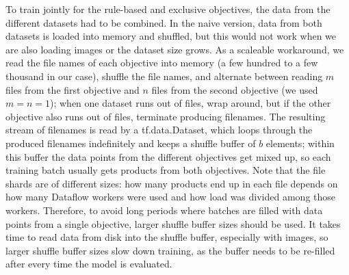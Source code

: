 To train jointly for the rule-based and exclusive objectives, the data from the different datasets had to be combined.
In the naive version, data from both datasets is loaded into memory and shuffled, but this would not work when we are also loading images or the dataset size grows.
As a scaleable workaround, we read the file names of each objective into memory (a few hundred to a few thousand in our case), shuffle the file names, and alternate between reading $m$ files from the first objective and $n$ files from the second objective (we used $m = n = 1$); when one dataset runs out of files, wrap around, but if the other objective also runs out of files, terminate producing filenames.
The resulting stream of filenames is read by a tf.data.Dataset, which loops through the produced filenames indefinitely and keeps a shuffle buffer of $b$ elements; within this buffer the data points from the different objectives get mixed up, so each training batch usually gets products from both objectives.
Note that the file shards are of different sizes: how many products end up in each file depends on how many Dataflow workers were used and how load was divided among those workers.
Therefore, to avoid long periods where batches are filled with data points from a single objective, larger shuffle buffer sizes should be used.
It takes time to read data from disk into the shuffle buffer, especially with images, so larger shuffle buffer sizes slow down training, as the buffer needs to be re-filled after every time the model is evaluated.

